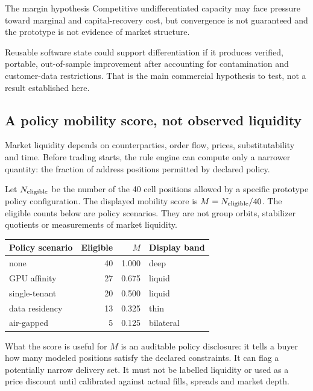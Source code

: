 \documentclass[11pt,letterpaper]{article}
\newcommand{\tagbox}[3]{\tikz[baseline=(X.base)]{\node[inner xsep=3.5pt,inner ysep=1.4pt,rounded corners=1.6pt,fill=#1,text=#2,font=\bfseries\sffamily\tiny] (X) {#3};}}
\newcommand{\MODELLED}{\tagbox{amberlite}{amber!55!black}{MODELLED}}
\begin{document}
\begin{keybox}{The margin hypothesis}
Competitive undifferentiated capacity may face pressure toward marginal and
capital-recovery cost, but convergence is not guaranteed and the prototype is
not evidence of market structure.

\vspace{5pt}
Reusable software state could support differentiation if it produces verified,
portable, out-of-sample improvement after accounting for contamination and
customer-data restrictions. That is the main commercial hypothesis to test,
not a result established here.
\end{keybox}

\subsection{A policy mobility score, not observed liquidity}

\begin{plainbox}[]
Market liquidity depends on counterparties, order flow, prices, substitutability
and time. Before trading starts, the rule engine can compute only a narrower
quantity: the fraction of address positions permitted by declared policy.
\end{plainbox}

Let $N_{\rm eligible}$ be the number of the 40 cell positions allowed by a
specific prototype policy configuration. The displayed mobility score is
$M=N_{\rm eligible}/40$. \MODELLED{} The eligible counts below are policy
scenarios. They are not group orbits, stabilizer quotients or measurements of
market liquidity.

\begin{center}
\renewcommand{\arraystretch}{1.2}
\begin{tabular}{@{}l r r l@{}}
\toprule
\textbf{Policy scenario} & \textbf{Eligible} & \textbf{$M$} & \textbf{Display band} \\
\midrule
none & 40 & 1.000 & deep \\
GPU affinity & 27 & 0.675 & liquid \\
single-tenant & 20 & 0.500 & liquid \\
data residency & 13 & 0.325 & thin \\
air-gapped & 5 & 0.125 & bilateral \\
\bottomrule
\end{tabular}
\end{center}

\begin{keybox}{What the score is useful for}
$M$ is an auditable policy disclosure: it tells a buyer how many modeled
positions satisfy the declared constraints. It can flag a potentially narrow
delivery set. It must not be labelled liquidity or used as a price discount
until calibrated against actual fills, spreads and market depth.
\end{keybox}
\end{document}
